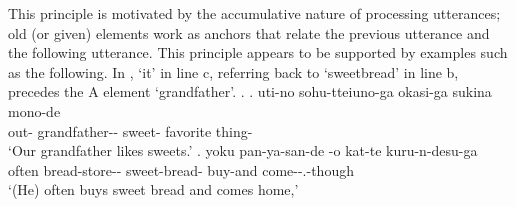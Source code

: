 This principle is motivated by the accumulative nature of processing utterances;
old (or given) elements work as anchors that relate
the previous utterance and the following utterance.
This principle appears to be supported by examples such as the following.
%
In \Next,
 `it' in line c, referring back to  `sweetbread' in line b, precedes the A element  `grandfather'.
%
\ex. \label{PronIni1}
 \ag. uti-no sohu-tteiuno-ga okasi-ga sukina mono-de \\
 		out- grandfather-- sweet- favorite thing- \\
		`Our grandfather likes sweets.'
 \bg. yoku pan-ya-san-de -o kat-te kuru-n-desu-ga \\
   often bread-store-- sweet-bread- buy-and come--.-though \\
   `(He) often buys sweet bread and comes home,'
